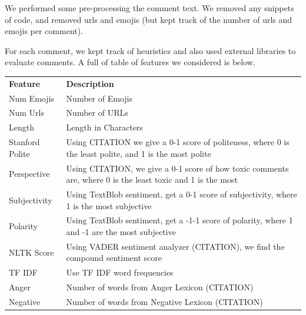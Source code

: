 \documentclass[conference]{IEEEtran}
\begin{document}
We performed some pre-processing the comment text. We removed any snippets of code, and removed urls and emojis (but kept track of the number of urls and emojis per comment). 


For each comment, we kept track of heuristics and also used external libraries to evaluate comments. A full of table of features we considered is below. 

\begin{table}[]
	\begin{tabular}{ll}
		\textbf{Feature} & \textbf{Description}                                                                                        \\
		Num Emojis       & Number of Emojis                                                                                            \\
		Num Urls         & Number of URLs                                                                                              \\
		Length           & Length in Characters                                                                                        \\
		Stanford Polite  & Using CITATION we give a 0-1 score of politeness, where 0 is the least polite, and 1 is the most polite     \\
		Perspective      & Using CITATION, we give a 0-1 score of how toxic comments are, where 0 is the least toxic and 1 is the most \\
		Subjectivity     & Using TextBlob sentiment, get a 0-1 score of subjectivity, where 1 is the most subjective                   \\
		Polarity         & Using TextBlob sentiment, get a -1-1 score of polarity, where 1 and -1 are the most subjective              \\
		NLTK Score       & Using VADER sentiment analyzer (CITATION), we find the compound sentiment score                             \\
		TF IDF           & Use TF IDF word frequencies                                                                                 \\
		Anger            & Number of words from Anger Lexicon (CITATION)                                                               \\
		Negative         & Number of words from Negative Lexicon (CITATION)                                                           
	\end{tabular}
\end{table}
\end{document}
